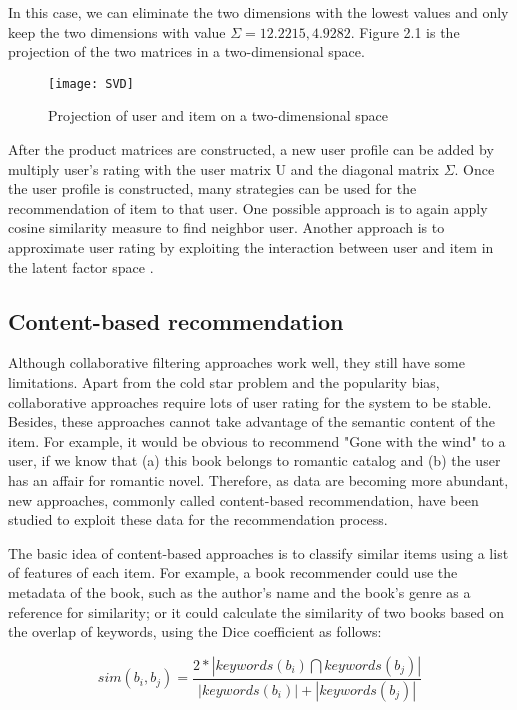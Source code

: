 In this case, we can eliminate the two dimensions with the lowest values and only keep the two dimensions with value \(\Sigma = {12.2215, 4.9282} \). Figure 2.1 is the projection of the two matrices in a two-dimensional space.

\begin{figure}[h]
\texttt{[image: SVD]}
\centering
\caption{Projection of user and item on a two-dimensional space}

\end{figure}

After the product matrices are constructed, a new user profile can be added by multiply user's rating with the user matrix U and the diagonal matrix \(\Sigma\). Once the user profile is constructed, many strategies can be used for the recommendation of item to that user. One possible approach is to again apply cosine similarity measure to find neighbor user. Another approach is to approximate user rating by exploiting the interaction between user and item in the latent factor space \cite{koren2009matrix}.

\subsection{Content-based recommendation}
Although collaborative filtering approaches work well, they still have some limitations. Apart from the cold star problem and the popularity bias, collaborative approaches require lots of user rating for the system to be stable. Besides, these approaches cannot take advantage of the semantic content of the item. For example, it would be obvious to recommend "Gone with the wind" to a user, if we know that (a) this book belongs to romantic catalog and (b) the user has an affair for romantic novel. Therefore, as data are becoming more abundant, new approaches, commonly called content-based recommendation, have been studied to exploit these data for the recommendation process.

The basic idea of content-based approaches is to classify similar items using a list of features of each item. For example, a book recommender could use the metadata of the book, such as the author's name and the book's genre as a reference for similarity; or it could calculate the similarity of two books based on the overlap of keywords, using the Dice coefficient \cite{salton1988syntactic} as follows:

\begin{displaymath}
sim(b_i, b_j) = \frac{2 * |keywords(b_i) \bigcap keywords(b_j)| }{|keywords(b_i)| + |keywords(b_j)|}
\end{displaymath}

